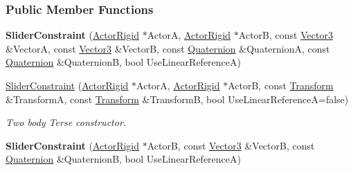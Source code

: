 \subsubsection*{Public Member Functions}
\begin{DoxyCompactItemize}
\item 
\hypertarget{classMezzanine_1_1SliderConstraint_aaeb70964ae4b2568a1dd70595f0d8567}{
{\bfseries SliderConstraint} (\hyperlink{classMezzanine_1_1ActorRigid}{ActorRigid} $\ast$ActorA, \hyperlink{classMezzanine_1_1ActorRigid}{ActorRigid} $\ast$ActorB, const \hyperlink{classMezzanine_1_1Vector3}{Vector3} \&VectorA, const \hyperlink{classMezzanine_1_1Vector3}{Vector3} \&VectorB, const \hyperlink{classMezzanine_1_1Quaternion}{Quaternion} \&QuaternionA, const \hyperlink{classMezzanine_1_1Quaternion}{Quaternion} \&QuaternionB, bool UseLinearReferenceA)}
\label{classMezzanine_1_1SliderConstraint_aaeb70964ae4b2568a1dd70595f0d8567}

\item 
\hyperlink{classMezzanine_1_1SliderConstraint_aa94ae163ab1a73a5a92f94172a8abdb3}{SliderConstraint} (\hyperlink{classMezzanine_1_1ActorRigid}{ActorRigid} $\ast$ActorA, \hyperlink{classMezzanine_1_1ActorRigid}{ActorRigid} $\ast$ActorB, const \hyperlink{classMezzanine_1_1Transform}{Transform} \&TransformA, const \hyperlink{classMezzanine_1_1Transform}{Transform} \&TransformB, bool UseLinearReferenceA=false)
\begin{DoxyCompactList}\small\item\em Two body Terse constructor. \item\end{DoxyCompactList}\item 
\hypertarget{classMezzanine_1_1SliderConstraint_a2f173d23f75cf90a91fbe2542d7ccd10}{
{\bfseries SliderConstraint} (\hyperlink{classMezzanine_1_1ActorRigid}{ActorRigid} $\ast$ActorB, const \hyperlink{classMezzanine_1_1Vector3}{Vector3} \&VectorB, const \hyperlink{classMezzanine_1_1Quaternion}{Quaternion} \&QuaternionB, bool UseLinearReferenceA)}
\label{classMezzanine_1_1SliderConstraint_a2f173d23f75cf90a91fbe2542d7ccd10}


\end{DoxyCompactItemize}
